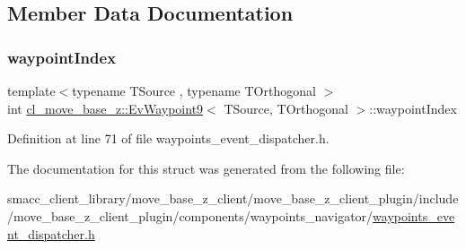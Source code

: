 \subsection{Member Data Documentation}
\mbox{\label{structcl__move__base__z_1_1EvWaypoint9_a51581dc5883298a3e25eec51d8fca78b}} 
\subsubsection{\texorpdfstring{waypoint\+Index}{waypointIndex}}
{\footnotesize\ttfamily template$<$typename T\+Source , typename T\+Orthogonal $>$ \\
int \hyperlink{structcl__move__base__z_1_1EvWaypoint9}{cl\+\_\+move\+\_\+base\+\_\+z\+::\+Ev\+Waypoint9}$<$ T\+Source, T\+Orthogonal $>$\+::waypoint\+Index}



Definition at line 71 of file waypoints\+\_\+event\+\_\+dispatcher.\+h.



The documentation for this struct was generated from the following file\+:\begin{DoxyCompactItemize}
\item 
smacc\+\_\+client\+\_\+library/move\+\_\+base\+\_\+z\+\_\+client/move\+\_\+base\+\_\+z\+\_\+client\+\_\+plugin/include/move\+\_\+base\+\_\+z\+\_\+client\+\_\+plugin/components/waypoints\+\_\+navigator/\hyperlink{waypoints__event__dispatcher_8h}{waypoints\+\_\+event\+\_\+dispatcher.\+h}\end{DoxyCompactItemize}
